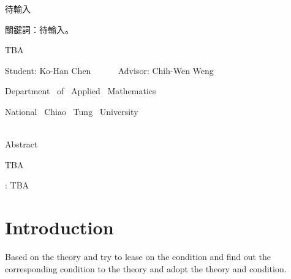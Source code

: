 \documentclass[12pt]{report}%
\renewcommand{\baselinestretch}{1.5} %
\theoremstyle{plain}
\theoremstyle{definition}
\begin{document}
待輸入\\
\bigskip

\noindent 關鍵詞：待輸入。
\pagebreak



\begin{center}{\LARGE
TBA
\bigskip\bigskip\bigskip}

{ \large
Student: Ko-Han Chen  ~~~~~ Advisor: Chih-Wen Weng \\
\Large

Department ~of~ Applied ~Mathematics
\bigskip

National~ Chiao ~Tung~ University
\bigskip\bigskip\bigskip\bigskip}\\
{\large Abstract}
\end{center}


TBA
\bigskip


: TBA
\pagebreak


\renewcommand{\baselinestretch}{1.2}
\large
\tableofcontents


\pagebreak

\label{Introduction}

\chapter{Introduction}
\normalsize
{}
Based on the theory and try to lease on the condition and find out the corresponding condition to the theory and adopt the theory and condition.
\end{document}
